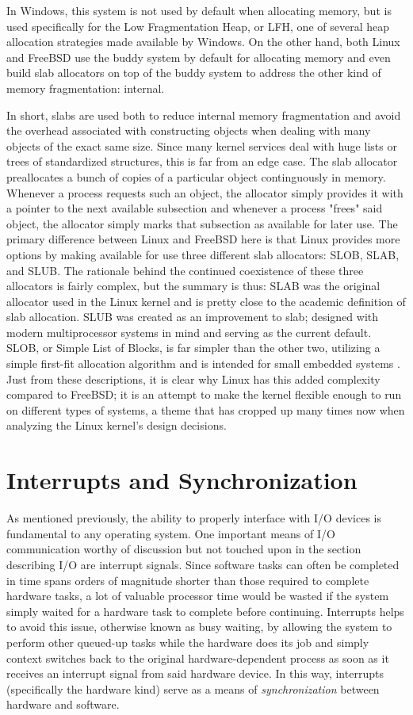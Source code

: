 \documentclass[onecolumn, draftclsnofoot,10pt, compsoc]{IEEEtran}
\begin{document}
In Windows, this system is not used by default when allocating memory, but is used specifically for the Low Fragmentation Heap, or LFH, one of several heap allocation strategies made available by Windows. On the other hand, both Linux and FreeBSD use the buddy system by default for allocating memory and even build slab allocators on top of the buddy system to address the other kind of memory fragmentation: internal.

In short, slabs are used both to reduce internal memory fragmentation and avoid the overhead associated with constructing objects when dealing with many objects of the exact same size. Since many kernel services deal with huge lists or trees of standardized structures, this is far from an edge case. The slab allocator preallocates a bunch of copies of a particular object continguously in memory. Whenever a process requests such an object, the allocator simply provides it with a pointer to the next available subsection and whenever a process "frees" said object, the allocator simply marks that subsection as available for later use. The primary difference between Linux and FreeBSD here is that Linux provides more options by making available for use three different slab allocators: SLOB, SLAB, and SLUB. The rationale behind the continued coexistence of these three allocators is fairly complex, but the summary is thus: SLAB was the original allocator used in the Linux kernel and is pretty close to the academic definition of slab allocation. SLUB was created as an improvement to slab; designed with modern multiprocessor systems in mind and serving as the current default. SLOB, or Simple List of Blocks, is far simpler than the other two, utilizing a simple first-fit allocation algorithm and is intended for small embedded systems \cite{SLAB}. Just from these descriptions, it is clear why Linux has this added complexity compared to FreeBSD; it is an attempt to make the kernel flexible enough to run on different types of systems, a theme that has cropped up many times now when analyzing the Linux kernel's design decisions.
\section{Interrupts and Synchronization}
As mentioned previously, the ability to properly interface with I/O devices is fundamental to any operating system. One important means of I/O communication worthy of discussion but not touched upon in the section describing I/O are interrupt signals. Since software tasks can often be completed in time spans orders of magnitude shorter than those required to complete hardware tasks, a lot of valuable processor time would be wasted if the system simply waited for a hardware task to complete before continuing. Interrupts helps to avoid this issue, otherwise known as busy waiting, by allowing the system to perform other queued-up tasks while the hardware does its job and simply context switches back to the original hardware-dependent process as soon as it receives an interrupt signal from said hardware device. In this way, interrupts (specifically the hardware kind) serve as a means of \textit{synchronization} between hardware and software.
\end{document}
